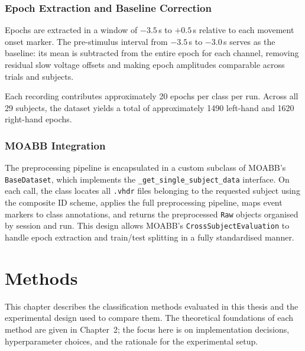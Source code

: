 \documentclass[english, bc, kiv, he, iso690alph, pdf]{fasthesis}
\begin{document}
\subsection{Epoch Extraction and Baseline Correction}

Epochs are extracted in a window of $-3.5$\,s to $+0.5$\,s relative to each movement onset marker. The pre-stimulus interval from $-3.5$\,s to $-3.0$\,s serves as the baseline: its mean is subtracted from the entire epoch for each channel, removing residual slow voltage offsets and making epoch amplitudes comparable across trials and subjects.

Each recording contributes approximately 20 epochs per class per run. Across all 29 subjects, the dataset yields a total of approximately 1490 left-hand and 1620 right-hand epochs.

\subsection{MOABB Integration}

The preprocessing pipeline is encapsulated in a custom subclass of MOABB's \texttt{BaseDataset}, which implements the \texttt{\_get\_\allowbreak single\_\allowbreak subject\_\allowbreak data} interface. On each call, the class locates all \texttt{.vhdr} files belonging to the requested subject using the composite ID scheme, applies the full preprocessing pipeline, maps event markers to class annotations, and returns the preprocessed \texttt{Raw} objects organised by session and run. This design allows MOABB's \texttt{Cross\allowbreak Subject\allowbreak Evaluation} to handle epoch extraction and train/test splitting in a fully standardised manner.

\chapter{Methods}

This chapter describes the classification methods evaluated in this thesis and the experimental design used to compare them. The theoretical foundations of each method are given in Chapter~2; the focus here is on implementation decisions, hyperparameter choices, and the rationale for the experimental setup.

\end{document}

